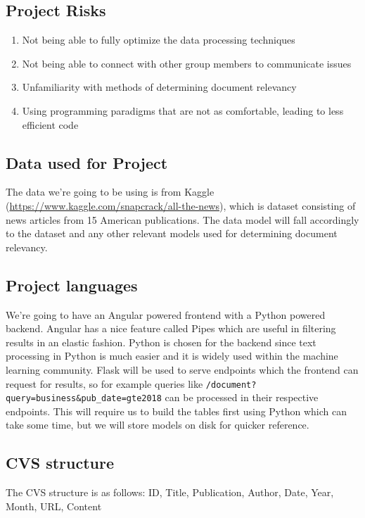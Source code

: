 \documentclass{article}
\begin{document}
\subsection{Project Risks}
\begin{enumerate}
    \item Not being able to fully optimize the data processing techniques
    \item Not being able to connect with other group members to communicate issues
    \item Unfamiliarity with methods of determining document relevancy
    \item Using programming paradigms that are not as comfortable, leading to less efficient code
\end{enumerate}
\subsection{Data used for Project}
The data we’re going to be using is from Kaggle (\url{https://www.kaggle.com/snapcrack/all-the-news}), which is dataset consisting of news articles from 15 American publications. The data model will fall accordingly to the dataset and any other relevant models used for determining document relevancy.
\subsection{Project languages}

We’re going to have an Angular powered frontend with a Python powered backend. Angular has a nice feature called Pipes which are useful in filtering results in an elastic fashion. Python is chosen for the backend since text processing in Python is much easier and it is widely used within the machine learning community. Flask will be used to serve endpoints which the frontend can request for results, so for example queries like 
\verb|/document?query=business&pub_date=gte2018| can be processed in their respective endpoints. This will require us to build the tables first using Python which can take some time, but we will 
store models on disk for quicker reference.
\subsection{CVS structure}
The CVS structure is as follows:\newline
ID, Title, Publication, Author, Date, Year, Month, URL, Content 
\end{document}
